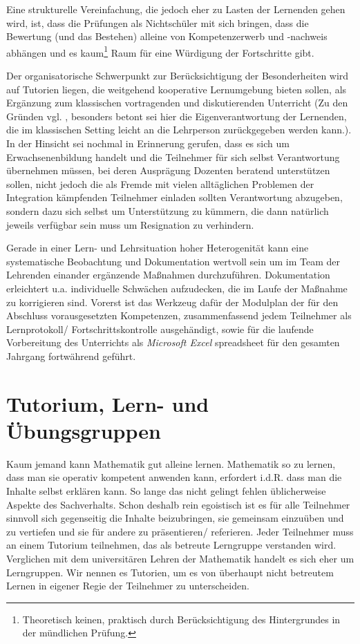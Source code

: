 \documentclass[a4paper]{book}%
\theoremstyle{definition}
\begin{document}
Eine strukturelle Vereinfachung, die jedoch eher zu Lasten der Lernenden gehen wird, ist, dass die Prüfungen als Nichtschüler mit sich bringen, dass die Bewertung (und das Bestehen) alleine von Kompetenzerwerb und -nachweis abhängen und es kaum\footnote{Theoretisch keinen, praktisch durch Berücksichtigung des Hintergrundes in der mündlichen Prüfung.} Raum für eine Würdigung der Fortschritte gibt.

Der organisatorische Schwerpunkt zur Berücksichtigung der Besonderheiten wird auf Tutorien liegen, die weitgehend kooperative Lernumgebung bieten sollen, als Ergänzung zum klassischen vortragenden und diskutierenden Unterricht (Zu den Gründen vgl. \citep[S.7ff]{Leiss2014}, besonders betont sei hier die Eigenverantwortung der Lernenden, die im klassischen Setting leicht an die Lehrperson zurückgegeben werden kann.). In der Hinsicht sei nochmal in Erinnerung gerufen, dass es sich um Erwachsenenbildung handelt und die Teilnehmer für sich selbst Verantwortung übernehmen müssen, bei deren Ausprägung Dozenten beratend unterstützen sollen, nicht jedoch die als Fremde mit vielen alltäglichen Problemen der Integration kämpfenden Teilnehmer einladen sollten Verantwortung abzugeben, sondern dazu sich selbst um Unterstützung zu kümmern, die dann natürlich jeweils verfügbar sein muss um Resignation zu verhindern.

Gerade in einer Lern- und Lehrsituation hoher Heterogenität kann eine systematische Beobachtung und Dokumentation wertvoll sein um im Team der Lehrenden einander ergänzende Maßnahmen durchzuführen. Dokumentation erleichtert u.a. individuelle Schwächen aufzudecken, die im Laufe der Maßnahme zu korrigieren sind. Vorerst ist das Werkzeug dafür der Modulplan der für den Abschluss vorausgesetzten Kompetenzen, zusammenfassend jedem Teilnehmer als Lernprotokoll/ Fortschrittskontrolle ausgehändigt, sowie für die laufende Vorbereitung des Unterrichts als \textit{Microsoft Excel} spreadsheet für den gesamten Jahrgang fortwährend geführt.


\chapter{Tutorium, Lern- und Übungsgruppen}\label{Tutorium}

Kaum jemand kann Mathematik gut alleine lernen. Mathematik so zu lernen, dass man sie operativ kompetent anwenden kann, erfordert i.d.R. dass man die Inhalte selbst erklären kann. So lange das nicht gelingt fehlen üblicherweise Aspekte des Sachverhalts. Schon deshalb rein egoistisch ist es für alle Teilnehmer sinnvoll sich gegenseitig die Inhalte beizubringen, sie gemeinsam einzuüben und zu vertiefen und sie für andere zu präsentieren/ referieren. Jeder Teilnehmer muss an einem Tutorium teilnehmen, das als betreute Lerngruppe verstanden wird. Verglichen mit dem universitären Lehren der Mathematik handelt es sich eher um Lerngruppen. Wir nennen es Tutorien, um es von überhaupt nicht betreutem Lernen in eigener Regie der Teilnehmer zu unterscheiden.
\end{document}
